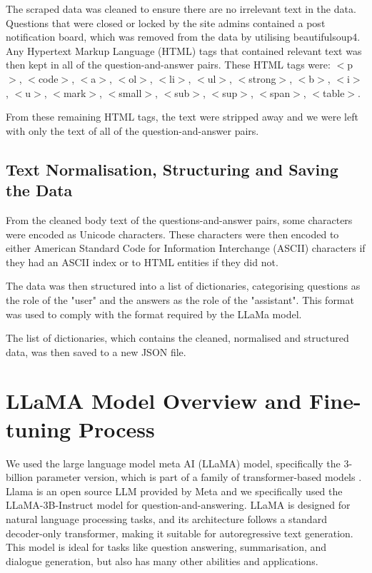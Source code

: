 \documentclass[10pt]{article}
\begin{document}
The scraped data was cleaned to ensure there are no irrelevant text in the data. Questions that
were closed or locked by the site admins contained a post notification board, which was removed
from the data by utilising beautifulsoup4. Any Hypertext Markup Language (HTML) tags that contained relevant text was then kept
in all of the question-and-answer pairs. These HTML tags were: $<$p$>$, $<$code$>$, $<$a$>$, $<$ol$>$, $<$li$>$, $<$ul$>$,
$<$strong$>$, $<$b$>$, $<$i$>$, $<$u$>$, $<$mark$>$, $<$small$>$, $<$sub$>$, $<$sup$>$, $<$span$>$, $<$table$>$.

From these remaining HTML tags, the text were stripped away and we were left with only the
text of all of the question-and-answer pairs.

\subsection{Text Normalisation, Structuring and Saving the Data}

From the cleaned body text of the questions-and-answer pairs, some characters were
encoded as Unicode characters. These characters were then encoded to either American Standard Code for Information Interchange (ASCII)
characters if they had an ASCII index or to HTML entities if they did not.

The data was then structured into a list of dictionaries, categorising questions as the role of the "user"
and the answers as the role of the "assistant". This format was used to comply with the format required by
the LLaMa model.

The list of dictionaries, which contains the cleaned, normalised and structured data, was then saved to
a new JSON file.

\section{LLaMA Model Overview and Fine-tuning Process}

We used the large language model meta AI (LLaMA) model, specifically the 3-billion parameter version,
which is part of a family of transformer-based models \cite{llama3herd}. Llama is an open source LLM provided by Meta
and we specifically used the LLaMA-3B-Instruct model for question-and-answering. LLaMA is designed for natural
language processing tasks, and its architecture follows a standard decoder-only transformer,
making it suitable for autoregressive text generation. This model is ideal for tasks like question answering,
summarisation, and dialogue generation, but also has many other abilities and applications.
\end{document}
